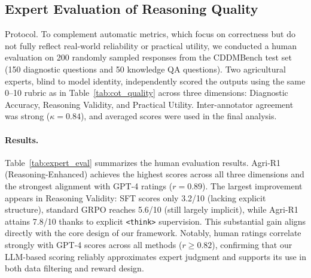 \documentclass[sigconf,anonymous,review]{acmart}
\begin{document}
\subsection{Expert Evaluation of Reasoning Quality}
\label{sec:human_eval}

Protocol.
To complement automatic metrics, which focus on correctness but do not fully reflect real-world reliability or practical utility, we conducted a human evaluation on 200 randomly sampled responses from the CDDMBench test set (150 diagnostic questions and 50 knowledge QA questions). Two agricultural experts, blind to model identity, independently scored the outputs using the same 0--10 rubric as in Table~\ref{tab:cot_quality} across three dimensions: Diagnostic Accuracy, Reasoning Validity, and Practical Utility. Inter-annotator agreement was strong ($\kappa=0.84$), and averaged scores were used in the final analysis.

\paragraph{Results.}
Table~\ref{tab:expert_eval} summarizes the human evaluation results. Agri-R1 (Reasoning-Enhanced) achieves the highest scores across all three dimensions and the strongest alignment with GPT-4 ratings ($r=0.89$). The largest improvement appears in Reasoning Validity: SFT scores only 3.2/10 (lacking explicit structure), standard GRPO reaches 5.6/10 (still largely implicit), while Agri-R1 attains 7.8/10 thanks to explicit \texttt{<think>} supervision. This substantial gain aligns directly with the core design of our framework. Notably, human ratings correlate strongly with GPT-4 scores across all methods ($r \ge 0.82$), confirming that our LLM-based scoring reliably approximates expert judgment and supports its use in both data filtering and reward design.
\end{document}
